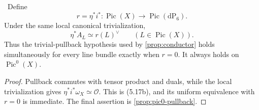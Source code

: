 \begin{proposition}
\label{prop:all-pic-restriction}
\Verified\ Define
\[
 r=\eta^*i^*:\operatorname{Pic}(X)\longrightarrow
 \operatorname{Pic}(\mathrm{dP}_6).
\]
Under the same local canonical trivialization,
\[
 \eta^*A_L\simeq r(L)^\vee
 \qquad(L\in\operatorname{Pic}(X)).
\tag{5.17b}
\]
Thus the trivial-pullback hypothesis used by
\cref{prop:conductor} holds simultaneously for every line bundle exactly
when $r=0$.  It always holds on $\operatorname{Pic}^0(X)$.
\end{proposition}

\begin{proof}
Pullback commutes with tensor product and duals, while the local
trivialization gives $\eta^*i^*\omega_X\simeq\mathcal O$.  This is (5.17b),
and its uniform equivalence with $r=0$ is immediate.  The final assertion is
\cref{prop:pic0-pullback}.
\end{proof}

